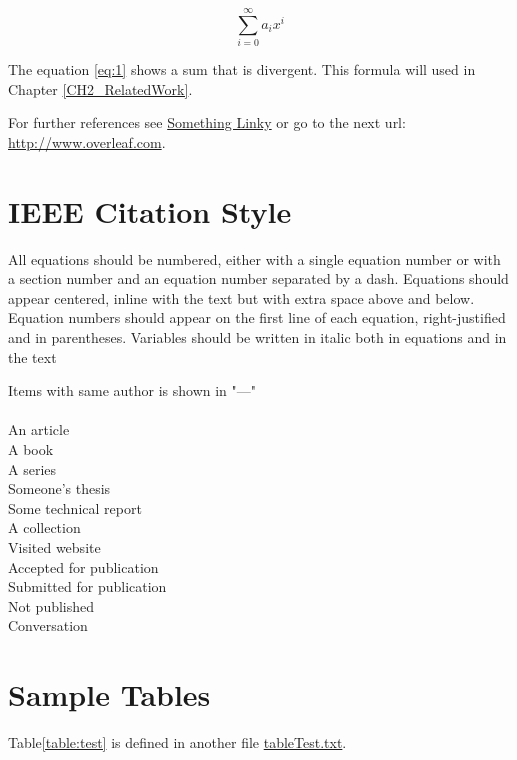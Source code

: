 \begin{equation}
\label{eq:1}
\sum_{i=0}^{\infty} a_i x^i
\end{equation}

The equation \ref{eq:1} shows a sum that is divergent. This formula 
will used in Chapter \ref{CH2_RelatedWork}.

For further references see \href{http://www.overleaf.com}{Something 
Linky} or go to the next url: \url{http://www.overleaf.com}.

\section{IEEE Citation Style}

All equations should be numbered, either with a single equation number or with a section number and an equation number separated by a dash. Equations should appear centered, inline with the text but with extra space above and below. Equation numbers should appear on the first line of each equation, right-justified and in parentheses. Variables should be written in italic both in equations and in the text

 Items with same author is shown in "---"\\
 \\

\noindent An article \cite{anarticle}\\
A book \cite{abook}\\
A series \cite{bookseries}\\
Someone's thesis \cite{thesis}\\
Some technical report \cite{report}\\
A collection \cite{collection}\\
Visited website \cite{website}\\
Accepted for publication \cite{acceptedpub}\\
Submitted for publication \cite{unpub}\\
Not published \cite{notpub}\\
Conversation \cite{conv}\\

\section{Sample Tables}

Table\ref{table:test} is defined in another file \href{run:./tableTest.tex}{tableTest.txt}. 

